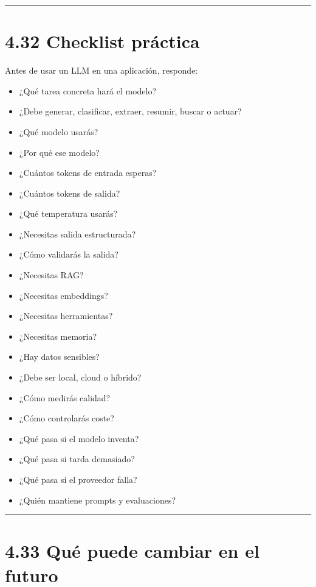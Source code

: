 \begin{center}\rule{0.5\linewidth}{0.5pt}\end{center}

\section{4.32 Checklist práctica}\label{checklist-pruxe1ctica-3}

Antes de usar un LLM en una aplicación, responde:

\begin{itemize}
\tightlist
\item
  ¿Qué tarea concreta hará el modelo?
\item
  ¿Debe generar, clasificar, extraer, resumir, buscar o actuar?
\item
  ¿Qué modelo usarás?
\item
  ¿Por qué ese modelo?
\item
  ¿Cuántos tokens de entrada esperas?
\item
  ¿Cuántos tokens de salida?
\item
  ¿Qué temperatura usarás?
\item
  ¿Necesitas salida estructurada?
\item
  ¿Cómo validarás la salida?
\item
  ¿Necesitas RAG?
\item
  ¿Necesitas embeddings?
\item
  ¿Necesitas herramientas?
\item
  ¿Necesitas memoria?
\item
  ¿Hay datos sensibles?
\item
  ¿Debe ser local, cloud o híbrido?
\item
  ¿Cómo medirás calidad?
\item
  ¿Cómo controlarás coste?
\item
  ¿Qué pasa si el modelo inventa?
\item
  ¿Qué pasa si tarda demasiado?
\item
  ¿Qué pasa si el proveedor falla?
\item
  ¿Quién mantiene prompts y evaluaciones?
\end{itemize}

\begin{center}\rule{0.5\linewidth}{0.5pt}\end{center}

\section{4.33 Qué puede cambiar en el
futuro}\label{quuxe9-puede-cambiar-en-el-futuro-3}

